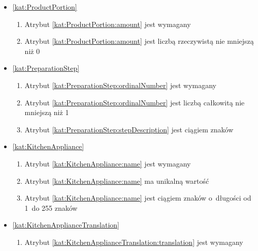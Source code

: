\begin{itemize}[label={\textbf{Ograniczenia dla}}, wide, labelwidth=!, labelindent=0pt]
    \item\ref{kat:ProductPortion}
    \begin{enumerate}[label={\textbf{OGR/\protect\threedigits{\arabic{enumi}}}}, wide, labelwidth=!, align=left, leftmargin=3cm, resume]
        \item Atrybut \ref{kat:ProductPortion:amount} jest wymagany

        \item Atrybut \ref{kat:ProductPortion:amount} jest liczbą rzeczywistą nie mniejszą niż 0
    \end{enumerate}

    \item\ref{kat:PreparationStep}
    \begin{enumerate}[label={\textbf{OGR/\protect\threedigits{\arabic{enumi}}}}, wide, labelwidth=!, align=left, leftmargin=3cm, resume]
        \item Atrybut \ref{kat:PreparationStep:ordinalNumber} jest wymagany

        \item Atrybut \ref{kat:PreparationStep:ordinalNumber} jest liczbą całkowitą nie mniejszą niż 1
        \item Atrybut \ref{kat:PreparationStep:stepDescription} jest ciągiem znaków
    \end{enumerate}

    \item\ref{kat:KitchenAppliance}
    \begin{enumerate}[label={\textbf{OGR/\protect\threedigits{\arabic{enumi}}}}, wide, labelwidth=!, align=left, leftmargin=3cm, resume]
        \item Atrybut \ref{kat:KitchenAppliance:name} jest wymagany

        \item Atrybut \ref{kat:KitchenAppliance:name} ma unikalną wartość

        \item Atrybut \ref{kat:KitchenAppliance:name} jest ciągiem znaków o~długości od 1~do 255 znaków
    \end{enumerate}

    \item\ref{kat:KitchenApplianceTranslation}
    \begin{enumerate}[label={\textbf{OGR/\protect\threedigits{\arabic{enumi}}}}, wide, labelwidth=!, align=left, leftmargin=3cm, resume]
        \item Atrybut \ref{kat:KitchenApplianceTranslation:translation} jest wymagany


\end{enumerate}
\end{itemize}
